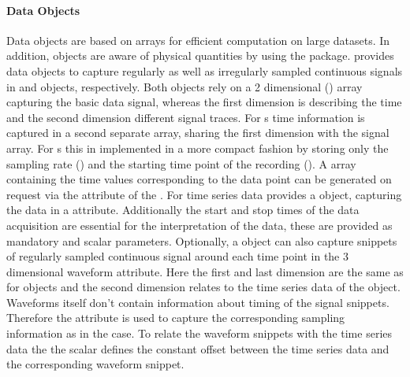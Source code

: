 \paragraph{Data Objects}
Data objects are based on  arrays \citep{Walt_2011} for efficient computation on large datasets. In addition,  objects are aware of physical quantities by using the  package\citep{Dale_}.
 provides data objects to capture regularly as well as irregularly sampled continuous signals in  and  objects, respectively. Both objects rely on a 2 dimensional  () array capturing the basic data signal, whereas the first dimension is describing the time and the second dimension different signal traces. For s time information is captured in a second separate  array, sharing the first dimension with the signal array. For s this in implemented in a more compact fashion by storing only the sampling rate () and the starting time point of the recording (). A  array containing the time values corresponding to the data point can be generated on request via the  attribute of the .
For time series data  provides a  object, capturing the data in a  attribute. Additionally the start and stop times of the data acquisition are essential for the interpretation of the data, these are provided as mandatory  and  scalar  parameters. Optionally, a  object can also capture snippets of regularly sampled continuous signal around each time point in the 3 dimensional waveform attribute. Here the first and last dimension are the same as for  objects and the second dimension relates to the time series data of the  object. Waveforms itself don't contain information about timing of the signal snippets. Therefore the attribute  is used to capture the corresponding sampling information as in the  case. To relate the waveform snippets with the time series data the the  scalar  defines the constant offset between the time series data and the corresponding waveform snippet.
